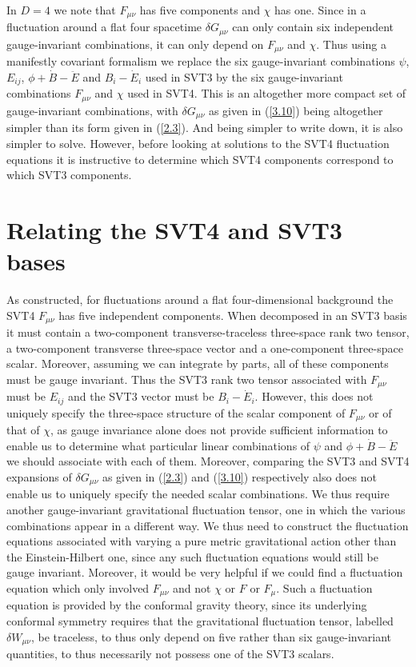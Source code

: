 \documentclass[aps,onecolumn,10pt]{revtex4}
\numberwithin{equation}{section}
\numberwithin{equation}{section}
\begin{document}
In $D=4$ we note that $F_{\mu\nu}$ has five components and $\chi$ has one. Since in a fluctuation around a flat four spacetime $\delta G_{\mu\nu}$ can only contain six independent gauge-invariant combinations, it can only depend on $F_{\mu\nu}$ and $\chi$. Thus using a manifestly covariant formalism we replace the six gauge-invariant combinations $\psi$, $E_{ij}$,  $\phi+\dot{B}-\ddot{E}$ and $B_i-\dot{E}_i$ used in SVT3 by the six gauge-invariant combinations $F_{\mu\nu}$ and $\chi$ used in SVT4. This is an altogether more compact set of gauge-invariant combinations, with $\delta G_{\mu\nu}$ as given in (\ref{3.10}) being altogether simpler than its form given in (\ref{2.3}). And being simpler to write down, it is also simpler to solve. However, before looking at solutions to the SVT4 fluctuation equations it is instructive to determine which SVT4 components correspond to which SVT3 components.


\section{Relating the SVT4 and SVT3 bases}
\label{S4}

As constructed, for fluctuations around a flat four-dimensional background the SVT4 $F_{\mu\nu}$ has five independent components. When decomposed in an SVT3 basis it must contain a two-component transverse-traceless three-space rank two tensor, a two-component transverse three-space vector and a one-component three-space scalar. Moreover, assuming we can integrate by parts, all of these components must be gauge invariant. Thus the SVT3 rank two tensor associated with $F_{\mu\nu}$ must be $E_{ij}$ and the SVT3 vector must be  $B_i-\dot{E}_i$. However, this does not uniquely specify the three-space structure of the scalar component of $F_{\mu\nu}$ or of that of $\chi$, as gauge invariance alone does not provide sufficient information to enable us to determine what particular linear combinations of  $\psi$ and  $\phi+\dot{B}-\ddot{E}$ we should associate with each of them. Moreover, comparing the SVT3 and SVT4 expansions of $\delta G_{\mu\nu}$ as given in (\ref{2.3}) and (\ref{3.10}) respectively also does not enable us to uniquely specify the needed scalar combinations. We thus require another gauge-invariant gravitational fluctuation tensor, one in which the various combinations appear in a different way. We thus need to construct the fluctuation equations associated with varying a pure metric gravitational action other than the Einstein-Hilbert one, since any such fluctuation equations would still be gauge invariant. Moreover, it would be very helpful if we could find a fluctuation equation which only involved $F_{\mu\nu}$ and not $\chi$ or $F$ or $F_{\mu}$. Such a fluctuation equation is provided by the conformal gravity theory, since its underlying conformal symmetry requires that the gravitational fluctuation tensor,  labelled $\delta W_{\mu\nu}$, be traceless, to thus only depend on five rather than six gauge-invariant quantities, to thus necessarily not possess one of the SVT3 scalars.
\end{document}
